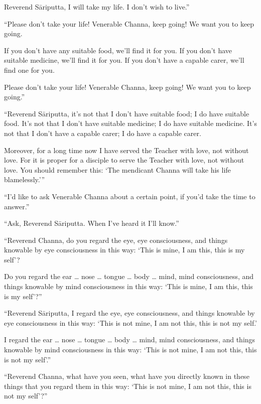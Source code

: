 \documentclass[12pt,openany]{book}%
\begin{document}
Reverend \textsanskrit{Sāriputta}, I will take my life. I don’t wish to live.” 

“Please don’t take your life! Venerable Channa, keep going! We want you to keep going. 

If you don’t have any suitable food, we’ll find it for you. If you don’t have suitable medicine, we’ll find it for you. If you don’t have a capable carer, we’ll find one for you. 

Please don’t take your life! Venerable Channa, keep going! We want you to keep going.” 

“Reverend \textsanskrit{Sāriputta}, it’s not that I don’t have suitable food; I do have suitable food. It’s not that I don’t have suitable medicine; I do have suitable medicine. It’s not that I don’t have a capable carer; I do have a capable carer. 

Moreover, for a long time now I have served the Teacher with love, not without love. For it is proper for a disciple to serve the Teacher with love, not without love. You should remember this: ‘The mendicant Channa will take his life blamelessly.’” 

“I’d like to ask Venerable Channa about a certain point, if you’d take the time to answer.” 

“Ask, Reverend \textsanskrit{Sāriputta}. When I’ve heard it I’ll know.” 

“Reverend Channa, do you regard the eye, eye consciousness, and things knowable by eye consciousness in this way: ‘This is mine, I am this, this is my self’? 

Do you regard the ear … nose … tongue … body … mind, mind consciousness, and things knowable by mind consciousness in this way: ‘This is mine, I am this, this is my self’?” 

“Reverend \textsanskrit{Sāriputta}, I regard the eye, eye consciousness, and things knowable by eye consciousness in this way: ‘This is not mine, I am not this, this is not my self.’ 

I regard the ear … nose … tongue … body … mind, mind consciousness, and things knowable by mind consciousness in this way: ‘This is not mine, I am not this, this is not my self’.” 

“Reverend Channa, what have you seen, what have you directly known in these things that you regard them in this way: ‘This is not mine, I am not this, this is not my self’?” 
\end{document}
